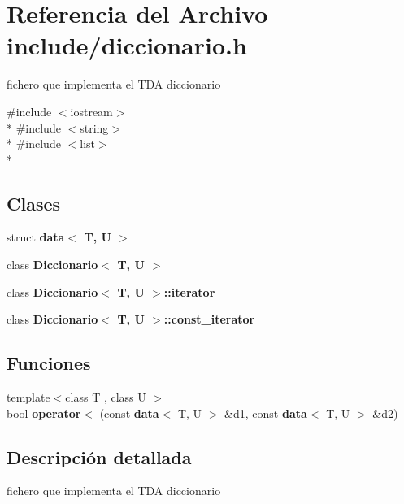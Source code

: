 \section{Referencia del Archivo include/diccionario.h}
\label{diccionario_8h}


fichero que implementa el T\+DA diccionario  


{\ttfamily \#include $<$iostream$>$}\\*
{\ttfamily \#include $<$string$>$}\\*
{\ttfamily \#include $<$list$>$}\\*
\subsection*{Clases}
\begin{DoxyCompactItemize}
\item 
struct {\bf data$<$ T, U $>$}
\item 
class {\bf Diccionario$<$ T, U $>$}
\item 
class {\bf Diccionario$<$ T, U $>$\+::iterator}
\item 
class {\bf Diccionario$<$ T, U $>$\+::const\+\_\+iterator}
\end{DoxyCompactItemize}
\subsection*{Funciones}
\begin{DoxyCompactItemize}
\item 
{\footnotesize template$<$class T , class U $>$ }\\bool {\bfseries operator$<$} (const {\bf data}$<$ T, U $>$ \&d1, const {\bf data}$<$ T, U $>$ \&d2)\label{diccionario_8h_ad151ee92c33630c87d1f13a5a3faf135}

\end{DoxyCompactItemize}


\subsection{Descripción detallada}
fichero que implementa el T\+DA diccionario 

